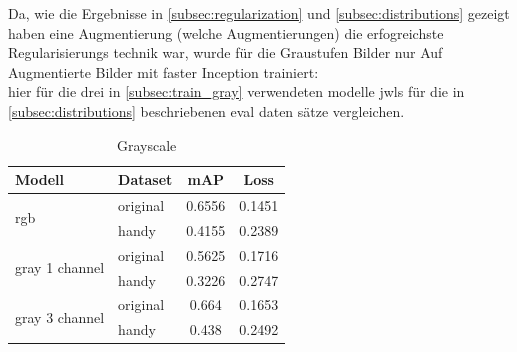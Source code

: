 Da, wie die Ergebnisse in \ref{subsec:regularization} und 
\ref{subsec:distributions} gezeigt haben eine Augmentierung (welche 
Augmentierungen) die erfogreichste Regularisierungs technik 
war, wurde für die Graustufen Bilder nur Auf Augmentierte Bilder 
mit faster Inception trainiert:
\\
hier für die drei in \ref{subsec:train_gray} verwendeten modelle 
jwls für die in \ref{subsec:distributions} beschriebenen eval daten 
sätze vergleichen.

\begin{table}[htb]
    \centering
    \label{tab:eval_gray}
    \begin{tabular}{| l | l || c | c |} 
        \hline
        Modell & Dataset & mAP & Loss\\
        \hline
        \multirow{2}{*}{rgb} & original & 0.6556 & 0.1451 \\
        & handy & 0.4155 & 0.2389 \\
        \hline
        \multirow{2}{*}{gray 1 channel} & original & 0.5625 & 0.1716 \\
        & handy & 0.3226 & 0.2747 \\
        \hline
        \multirow{2}{*}{gray 3 channel} & original & 0.664 & 0.1653 \\
        & handy & 0.438 & 0.2492 \\
        \hline
    \end{tabular}        
    \caption{Grayscale}
\end{table}


